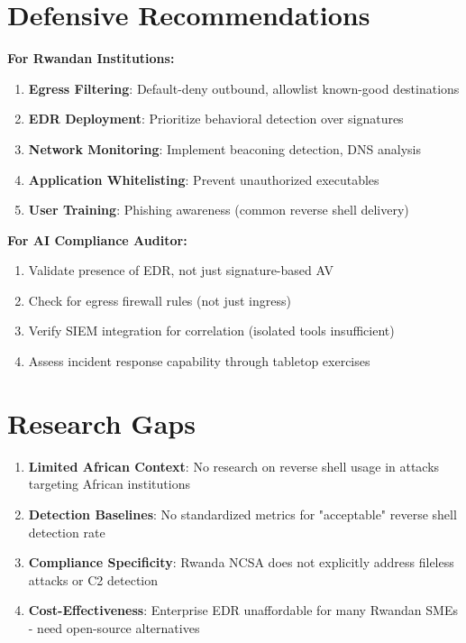 \documentclass[11pt,conference]{IEEEtran}
\begin{document}
\section{Defensive Recommendations}

\textbf{For Rwandan Institutions:}
\begin{enumerate}
    \item \textbf{Egress Filtering}: Default-deny outbound, allowlist known-good destinations
    \item \textbf{EDR Deployment}: Prioritize behavioral detection over signatures
    \item \textbf{Network Monitoring}: Implement beaconing detection, DNS analysis
    \item \textbf{Application Whitelisting}: Prevent unauthorized executables
    \item \textbf{User Training}: Phishing awareness (common reverse shell delivery)
\end{enumerate}

\textbf{For AI Compliance Auditor:}
\begin{enumerate}
    \item Validate presence of EDR, not just signature-based AV
    \item Check for egress firewall rules (not just ingress)
    \item Verify SIEM integration for correlation (isolated tools insufficient)
    \item Assess incident response capability through tabletop exercises
\end{enumerate}

\section{Research Gaps}

\begin{enumerate}
    \item \textbf{Limited African Context}: No research on reverse shell usage in attacks targeting African institutions
    \item \textbf{Detection Baselines}: No standardized metrics for "acceptable" reverse shell detection rate
    \item \textbf{Compliance Specificity}: Rwanda NCSA does not explicitly address fileless attacks or C2 detection
    \item \textbf{Cost-Effectiveness}: Enterprise EDR unaffordable for many Rwandan SMEs - need open-source alternatives
\end{enumerate}
\end{document}
